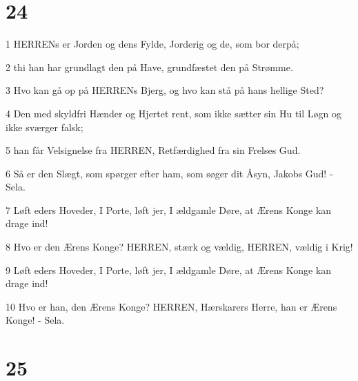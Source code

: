 \chapter{24}

\par 1 HERRENs er Jorden og dens Fylde, Jorderig og de, som bor derpå;
\par 2 thi han har grundlagt den på Have, grundfæstet den på Strømme.
\par 3 Hvo kan gå op på HERRENs Bjerg, og hvo kan stå på hans hellige Sted?
\par 4 Den med skyldfri Hænder og Hjertet rent, som ikke sætter sin Hu til Løgn og ikke sværger falsk;
\par 5 han får Velsignelse fra HERREN, Retfærdighed fra sin Frelses Gud.
\par 6 Så er den Slægt, som spørger efter ham, som søger dit Åsyn, Jakobs Gud! - Sela.
\par 7 Løft eders Hoveder, I Porte, løft jer, I ældgamle Døre, at Ærens Konge kan drage ind!
\par 8 Hvo er den Ærens Konge? HERREN, stærk og vældig, HERREN, vældig i Krig!
\par 9 Løft eders Hoveder, I Porte, løft jer, I ældgamle Døre, at Ærens Konge kan drage ind!
\par 10 Hvo er han, den Ærens Konge? HERREN, Hærskarers Herre, han er Ærens Konge! - Sela.

\chapter{25}

